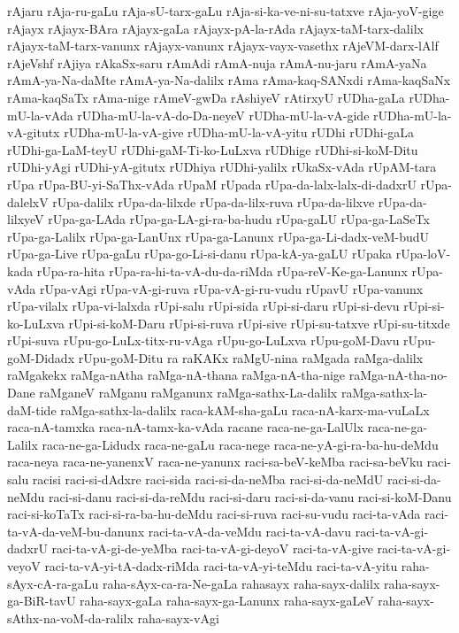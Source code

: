 {rAjaru
rAja-ru-gaLu
rAja-sU-tarx-gaLu
rAja-si-ka-ve-ni-su-tatxve
rAja-yoV-gige
rAjayx
rAjayx-BAra
rAjayx-gaLa
rAjayx-pA-la-rAda
rAjayx-taM-tarx-dalilx
rAjayx-taM-tarx-vanunx
rAjayx-vanunx
rAjayx-vayx-vasethx
rAjeVM-darx-lAlf
rAjeVshf
rAjiya
rAkaSx-saru
rAmAdi
rAmA-nuja
rAmA-nu-jaru
rAmA-yaNa
rAmA-ya-Na-daMte
rAmA-ya-Na-dalilx
rAma
rAma-kaq-SANxdi
rAma-kaqSaNx
rAma-kaqSaTx
rAma-nige
rAmeV-gwDa
rAshiyeV
rAtirxyU
rUDha-gaLa
rUDha-mU-la-vAda
rUDha-mU-la-vA-do-Da-neyeV
rUDha-mU-la-vA-gide
rUDha-mU-la-vA-gitutx
rUDha-mU-la-vA-give
rUDha-mU-la-vA-yitu
rUDhi
rUDhi-gaLa
rUDhi-ga-LaM-teyU
rUDhi-gaM-Ti-ko-LuLxva
rUDhige
rUDhi-si-koM-Ditu
rUDhi-yAgi
rUDhi-yA-gitutx
rUDhiya
rUDhi-yalilx
rUkaSx-vAda
rUpAM-tara
rUpa
rUpa-BU-yi-SaThx-vAda
rUpaM
rUpada
rUpa-da-lalx-lalx-di-dadxrU
rUpa-dalelxV
rUpa-dalilx
rUpa-da-lilxde
rUpa-da-lilx-ruva
rUpa-da-lilxve
rUpa-da-lilxyeV
rUpa-ga-LAda
rUpa-ga-LA-gi-ra-ba-hudu
rUpa-gaLU
rUpa-ga-LaSeTx
rUpa-ga-Lalilx
rUpa-ga-LanUnx
rUpa-ga-Lanunx
rUpa-ga-Li-dadx-veM-budU
rUpa-ga-Live
rUpa-gaLu
rUpa-go-Li-si-danu
rUpa-kA-ya-gaLU
rUpaka
rUpa-loV-kada
rUpa-ra-hita
rUpa-ra-hi-ta-vA-du-da-riMda
rUpa-reV-Ke-ga-Lanunx
rUpa-vAda
rUpa-vAgi
rUpa-vA-gi-ruva
rUpa-vA-gi-ru-vudu
rUpavU
rUpa-vanunx
rUpa-vilalx
rUpa-vi-lalxda
rUpi-salu
rUpi-sida
rUpi-si-daru
rUpi-si-devu
rUpi-si-ko-LuLxva
rUpi-si-koM-Daru
rUpi-si-ruva
rUpi-sive
rUpi-su-tatxve
rUpi-su-titxde
rUpi-suva
rUpu-go-LuLx-titx-ru-vAga
rUpu-go-LuLxva
rUpu-goM-Davu
rUpu-goM-Didadx
rUpu-goM-Ditu
ra
raKAKx
raMgU-nina
raMgada
raMga-dalilx
raMgakekx
raMga-nAtha
raMga-nA-thana
raMga-nA-tha-nige
raMga-nA-tha-no-Dane
raMganeV
raMganu
raMganunx
raMga-sathx-La-dalilx
raMga-sathx-la-daM-tide
raMga-sathx-la-dalilx
raca-kAM-sha-gaLu
raca-nA-karx-ma-vuLaLx
raca-nA-tamxka
raca-nA-tamx-ka-vAda
racane
raca-ne-ga-LalUlx
raca-ne-ga-Lalilx
raca-ne-ga-Lidudx
raca-ne-gaLu
raca-nege
raca-ne-yA-gi-ra-ba-hu-deMdu
raca-neya
raca-ne-yanenxV
raca-ne-yanunx
raci-sa-beV-keMba
raci-sa-beVku
raci-salu
racisi
raci-si-dAdxre
raci-sida
raci-si-da-neMba
raci-si-da-neMdU
raci-si-da-neMdu
raci-si-danu
raci-si-da-reMdu
raci-si-daru
raci-si-da-vanu
raci-si-koM-Danu
raci-si-koTaTx
raci-si-ra-ba-hu-deMdu
raci-si-ruva
raci-su-vudu
raci-ta-vAda
raci-ta-vA-da-veM-bu-danunx
raci-ta-vA-da-veMdu
raci-ta-vA-davu
raci-ta-vA-gi-dadxrU
raci-ta-vA-gi-de-yeMba
raci-ta-vA-gi-deyoV
raci-ta-vA-give
raci-ta-vA-gi-veyoV
raci-ta-vA-yi-tA-dadx-riMda
raci-ta-vA-yi-teMdu
raci-ta-vA-yitu
raha-sAyx-cA-ra-gaLu
raha-sAyx-ca-ra-Ne-gaLa
rahasayx
raha-sayx-dalilx
raha-sayx-ga-BiR-tavU
raha-sayx-gaLa
raha-sayx-ga-Lanunx
raha-sayx-gaLeV
raha-sayx-sAthx-na-voM-da-ralilx
raha-sayx-vAgi
}
